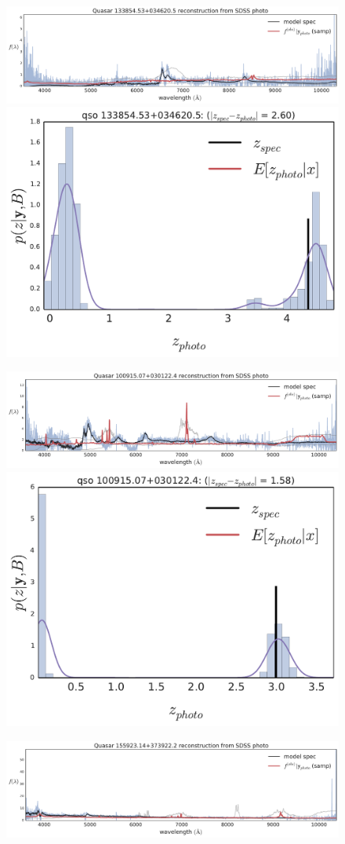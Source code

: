\documentclass{article}
\begin{document}
\begin{figure}[t]
\centerline{
\includegraphics[width=1.5\columnwidth]{../../figs/quasar_plots/quasar_2_mcmc_recon}
\includegraphics[width=.56\columnwidth]{../../figs/quasar_plots/quasar_2_posterior_z}
}
\centerline{
\includegraphics[width=1.5\columnwidth]{../../figs/quasar_plots/quasar_1409_mcmc_recon}
\includegraphics[width=.56\columnwidth]{../../figs/quasar_plots/quasar_1409_posterior_z}
}
\centerline{
\includegraphics[width=1.5\columnwidth]{../../figs/quasar_plots/quasar_554_mcmc_recon}
}
\end{figure}
\end{document}
